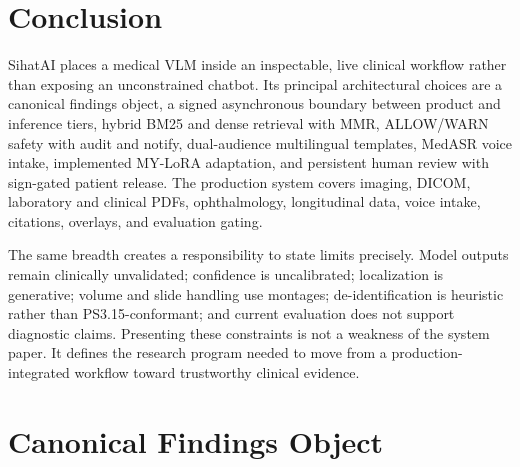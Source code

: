 \documentclass[conference]{IEEEtran}
\begin{document}
\section{Conclusion}

SihatAI places a medical VLM inside an inspectable, live clinical workflow rather than exposing an unconstrained chatbot. Its principal architectural choices are a canonical findings object, a signed asynchronous boundary between product and inference tiers, hybrid BM25 and dense retrieval with MMR, ALLOW/WARN safety with audit and notify, dual-audience multilingual templates, MedASR voice intake, implemented MY-LoRA adaptation, and persistent human review with sign-gated patient release. The production system covers imaging, DICOM, laboratory and clinical PDFs, ophthalmology, longitudinal data, voice intake, citations, overlays, and evaluation gating.

The same breadth creates a responsibility to state limits precisely. Model outputs remain clinically unvalidated; confidence is uncalibrated; localization is generative; volume and slide handling use montages; de-identification is heuristic rather than PS3.15-conformant; and current evaluation does not support diagnostic claims. Presenting these constraints is not a weakness of the system paper. It defines the research program needed to move from a production-integrated workflow toward trustworthy clinical evidence.

\appendices

\section{Canonical Findings Object}
\end{document}
